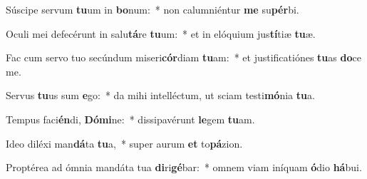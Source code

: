\item Súscipe servum \textbf{tu}um in \textbf{bo}num:~* non calumniéntur \textbf{me} su\textbf{pér}bi.
\item Oculi mei defecérunt in salu\textbf{tá}re \textbf{tu}um:~* et in elóquium jus\textbf{tí}tiæ \textbf{tu}æ.
\item Fac cum servo tuo secúndum miseri\textbf{cór}diam \textbf{tu}am:~* et justificatiónes \textbf{tu}as \textbf{do}ce me.
\item Servus \textbf{tu}us sum \textbf{e}go:~* da mihi intelléctum, ut sciam testi\textbf{mó}nia \textbf{tu}a.
\item Tempus faci\textbf{én}di, \textbf{Dó}\textbf{mi}ne:~* dissipavérunt \textbf{le}gem \textbf{tu}am.
\item Ideo diléxi man\textbf{dá}ta \textbf{tu}a,~* super aurum \textbf{et} to\textbf{pá}zion.
\item Proptérea ad ómnia mandáta tua \textbf{di}ri\textbf{gé}bar:~* omnem viam iníquam \textbf{ó}dio \textbf{há}bui.
